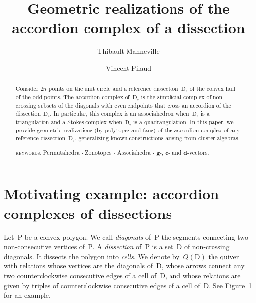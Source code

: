 \documentclass{amsart}
\title[Geometric realizations of the accordion complex of a dissection]{Geometric realizations of the \\ accordion complex of a dissection}
\author{Thibault Manneville}
\author{Vincent Pilaud}
\theoremstyle{definition}
\renewcommand{\b}[1]{\mathbf{#1}} %
\newcommand{\fref}[1]{Figure~\ref{#1}} %
\newcommand{\darkblue}{\color{darkblue}} %
\newcommand{\defn}[1]{\textsl{\darkblue #1}} %
\newcommand{\polygon}{\mathrm{P}} %
\newcommand{\dissection}{\mathrm{D}} %
\begin{document}
\begin{abstract}
Consider $2n$ points on the unit circle and a reference dissection~$\dissection_\circ$ of the convex hull of the odd points. The accordion complex of~$\dissection_\circ$ is the simplicial complex of non-crossing subsets of the diagonals with even endpoints that cross an accordion of the dissection~$\dissection_\circ$. In particular, this complex is an associahedron when~$\dissection_\circ$ is a triangulation and a Stokes complex when~$\dissection_\circ$ is a quadrangulation. In this paper, we provide geometric realizations (by polytopes and fans) of the accordion complex of any reference dissection~$\dissection_\circ$, generalizing known constructions arising from cluster algebras.

\medskip
\noindent
\textsc{keywords.} Permutahedra $\cdot$ Zonotopes $\cdot$ Associahedra $\cdot$ $\b{g}$-, $\b{c}$- and $\b{d}$-vectors.
\end{abstract}

\vspace*{-1cm}



\section{Motivating example: accordion complexes of dissections}

Let~$\polygon$ be a convex polygon.
We call \defn{diagonals} of~$\polygon$ the segments connecting two non-consecutive vertices of~$\polygon$.
A \defn{dissection} of~$\polygon$ is a set~$\dissection$ of non-crossing diagonals.
It dissects the polygon into \defn{cells}.
We denote by~$Q(\dissection)$ the quiver with relations whose vertices are the diagonals of~$\dissection$, whose arrows connect any two counterclockwise consecutive edges of a cell of~$\dissection$, and whose relations are given by triples of counterclockwise consecutive edges of a cell of~$\dissection$.
See \fref{} for an example.
\end{document}
